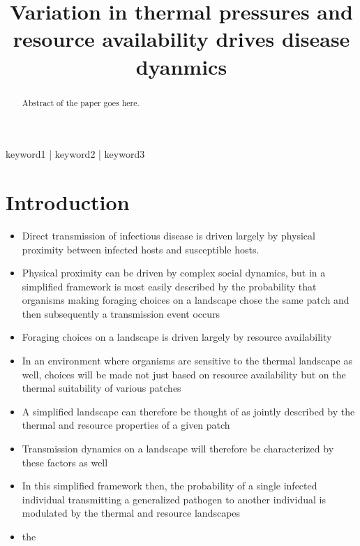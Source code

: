 
\title{Variation in thermal pressures and resource availability drives disease dyanmics}

\author[1]{
  
}
\date{}

\maketitle

\begin{abstract}
Abstract of the paper goes here.
\lipsum[1]
\end{abstract}

\begin{keywords}
keyword1 | keyword2 | keyword3
\end{keywords}

\begin{corrauthor}
\end{corrauthor}

\section*{Introduction}\label{s:introduction}

\begin{itemize}
    \item Direct transmission of infectious disease is driven largely by physical proximity between infected hosts and susceptible hosts. 
    \item Physical proximity can be driven by complex social dynamics, but in a simplified framework is most easily described by the probability that organisms making foraging choices on a landscape chose the same patch and then subsequently a transmission event occurs
    \item Foraging choices on a landscape is driven largely by resource availability
    \item In an environment where organisms are sensitive to the thermal landscape as well, choices will be made not just based on resource availability but on the thermal suitability of various patches
    \item A simplified landscape can therefore be thought of as jointly described by the thermal and resource properties of a given patch 
    \item Transmission dynamics on a landscape will therefore be characterized by these factors as well
    \item In this simplified framework then, the probability of a single infected individual transmitting a generalized pathogen to another individual is modulated by the thermal and resource landscapes
    \item the 
\end{itemize}

